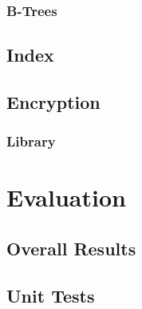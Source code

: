\documentclass[12pt,a4paper,twoside,openright]{report}
\begin{document}
\subsection{B-Trees}

\section{Index}
\label{sec:index}

\section{Encryption}
\label{sec:encryption}

\subsection{Library}

\chapter{Evaluation}











\section{Overall Results}

\section{Unit Tests}
\end{document}
